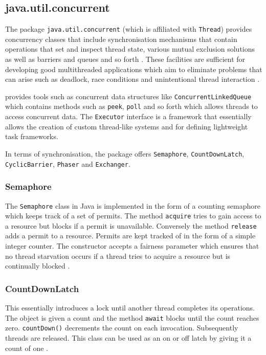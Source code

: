 \documentclass[12pt] {newrucsthesis}    %
\def\code#1{\texttt{#1}}
\begin{document}
      \subsection{java.util.concurrent}
        The package \code{java.util.concurrent} (which is affiliated with \code{Thread}) provides concurrency
        classes that include synchronisation mechanisms that contain operations that set and inspect thread state,
        various mutual exclusion solutions as well as barriers and queues and so forth \citep{Lea_java.util.concurrent}.
        These facilities are sufficient for developing good multithreaded applications which aim to eliminate problems
        that can arise such as deadlock, race conditions and unintentional thread interaction \citep{WellsEfficientIPCJava}.

        \cite{JavaAPI} provides tools such as concurrent data structures like  \code{ConcurrentLinkedQueue}
        which contains methods such as \code{peek}, \code{poll} and so forth which allows threads to access
        concurrent data. The \code{Executor} interface is a framework that essentially allows the creation of
        custom thread-like systems and for defining lightweight task frameworks.

        In terms of synchronisation, the package offers \code{Semaphore},
        \code{CountDownLatch}, \code{CyclicBarrier}, \code{Phaser} and
        \code{Exchanger}.

        \subsubsection{Semaphore}
          The \code{Semaphore} class in Java is implemented in the form of a counting semaphore which
          keeps track of a set of permits. The method \code{acquire} tries to gain access to a resource but
          blocks if a permit is unavailable. Conversely the method \code{release} adds a permit to a resource.
          Permits are kept tracked of in the form of a simple integer counter. The constructor accepts a fairness
          parameter which ensures that no thread starvation occurs if a thread tries to acquire a resource but is
          continually blocked \citep{JavaAPI}.

        \subsubsection{CountDownLatch}
          This essentially introduces a lock until another thread completes its operations.
          The object is given a count and the method \code{await} blocks until the count reaches zero.
          \code{countDown()} decrements the count on each invocation.
          Subsequently threads are released. This class can be used as an on
          or off latch by giving it a count of one \citep{JavaAPI}.
\end{document}
